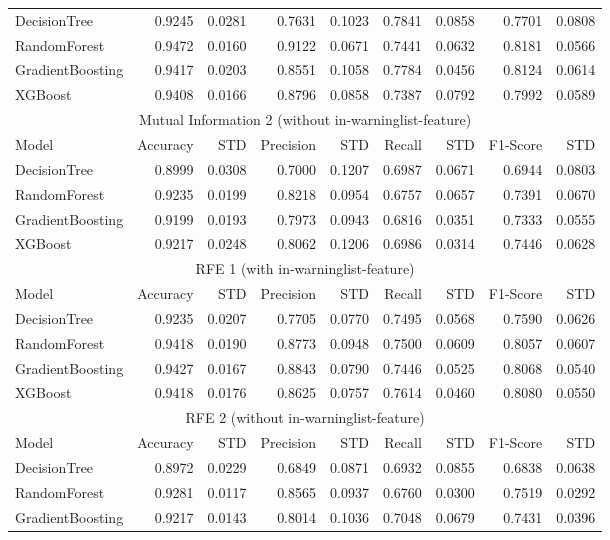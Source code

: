 \documentclass[11pt]{article}
\begin{document}
\begin{tabular}{l|rr|rr|rr|rr}
	\hline
	DecisionTree & 0.9245 & 0.0281 & 0.7631 & 0.1023 & 0.7841 & 0.0858 & 0.7701 & 0.0808 \\
	RandomForest  & 0.9472 & 0.0160 & 0.9122 & 0.0671 & 0.7441 & 0.0632 & 0.8181 & 0.0566 \\
	GradientBoosting  & 0.9417 & 0.0203 & 0.8551 & 0.1058 & 0.7784 & 0.0456 & 0.8124 & 0.0614 \\
	XGBoost  & 0.9408 & 0.0166 & 0.8796 & 0.0858 & 0.7387 & 0.0792 & 0.7992 & 0.0589 \\
	\multicolumn{9}{c}{Mutual Information 2 (without in-warninglist-feature)}\\
	Model & Accuracy & STD & Precision & STD & Recall & STD & F1-Score & STD \\
	\hline
	DecisionTree & 0.8999 & 0.0308 & 0.7000 & 0.1207 & 0.6987 & 0.0671 & 0.6944 & 0.0803 \\
	RandomForest & 0.9235 & 0.0199 & 0.8218 & 0.0954 & 0.6757 & 0.0657 & 0.7391 & 0.0670 \\
	GradientBoosting & 0.9199 & 0.0193 & 0.7973 & 0.0943 & 0.6816 & 0.0351 & 0.7333 & 0.0555 \\
	XGBoost & 0.9217 & 0.0248 & 0.8062 & 0.1206 & 0.6986 & 0.0314 & 0.7446 & 0.0628 \\
	\multicolumn{9}{c}{RFE 1 (with in-warninglist-feature)}\\
	Model & Accuracy & STD & Precision & STD & Recall & STD & F1-Score & STD \\
	\hline
	DecisionTree & 0.9235 & 0.0207 & 0.7705 & 0.0770 & 0.7495 & 0.0568 & 0.7590 & 0.0626 \\
	RandomForest & 0.9418 & 0.0190 & 0.8773 & 0.0948 & 0.7500 & 0.0609 & 0.8057 & 0.0607 \\
	GradientBoosting & 0.9427 & 0.0167 & 0.8843 & 0.0790 & 0.7446 & 0.0525 & 0.8068 & 0.0540 \\
	XGBoost & 0.9418 & 0.0176 & 0.8625 & 0.0757 & 0.7614 & 0.0460 & 0.8080 & 0.0550 \\
	\multicolumn{9}{c}{RFE 2 (without in-warninglist-feature)}\\
	Model & Accuracy & STD & Precision & STD & Recall & STD & F1-Score & STD \\
	\hline
	DecisionTree & 0.8972 & 0.0229 & 0.6849 & 0.0871 & 0.6932 & 0.0855 & 0.6838 & 0.0638 \\
	RandomForest & 0.9281 & 0.0117 & 0.8565 & 0.0937 & 0.6760 & 0.0300 & 0.7519 & 0.0292 \\
	GradientBoosting  & 0.9217 & 0.0143 & 0.8014 & 0.1036 & 0.7048 & 0.0679 & 0.7431 & 0.0396 \\

\end{tabular}
\end{document}
